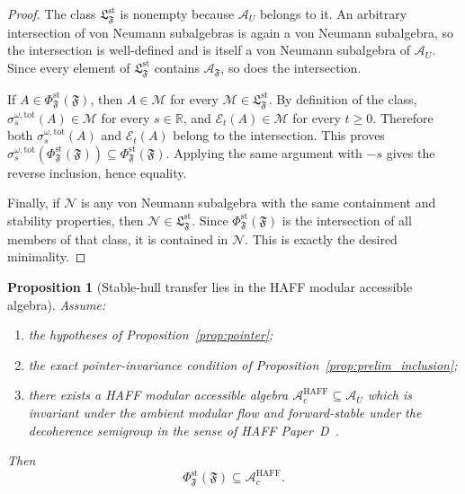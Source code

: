 \documentclass[12pt]{article}
\newtheorem{proposition}[theorem]{Proposition}
\theoremstyle{definition}
\theoremstyle{remark}
\begin{document}
\begin{proof}
The class \(\mathfrak L_{\mathfrak F}^{\mathrm{st}}\) is nonempty
because \(\mathcal A_U\) belongs to it. An arbitrary intersection of
von Neumann subalgebras is again a von Neumann subalgebra, so the
intersection is well-defined and is itself a von Neumann subalgebra of
\(\mathcal A_U\). Since every element of
\(\mathfrak L_{\mathfrak F}^{\mathrm{st}}\) contains
\(\mathcal A_{\mathfrak F}\), so does the intersection.

If \(A\in\Phi_{\mathfrak F}^{\mathrm{st}}(\mathfrak F)\), then
\(A\in\mathcal M\) for every
\(\mathcal M\in\mathfrak L_{\mathfrak F}^{\mathrm{st}}\). By definition
of the class,
\(\sigma_s^{\omega,\mathrm{tot}}(A)\in\mathcal M\) for every
\(s\in\mathbb R\), and
\(\mathcal E_t(A)\in\mathcal M\) for every \(t\ge 0\). Therefore both
\(\sigma_s^{\omega,\mathrm{tot}}(A)\) and \(\mathcal E_t(A)\) belong to
the intersection. This proves
\(\sigma_s^{\omega,\mathrm{tot}}(\Phi_{\mathfrak F}^{\mathrm{st}}(\mathfrak F))
\subseteq \Phi_{\mathfrak F}^{\mathrm{st}}(\mathfrak F)\). Applying the
same argument with \(-s\) gives the reverse inclusion, hence equality.

Finally, if \(\mathcal N\) is any von Neumann subalgebra with the same
containment and stability properties, then
\(\mathcal N\in\mathfrak L_{\mathfrak F}^{\mathrm{st}}\). Since
\(\Phi_{\mathfrak F}^{\mathrm{st}}(\mathfrak F)\) is the intersection of
all members of that class, it is contained in \(\mathcal N\). This is
exactly the desired minimality.
\end{proof}

\begin{proposition}[Stable-hull transfer lies in the HAFF modular accessible algebra]\label{prop:stablehull_inclusion}
Assume:
\begin{enumerate}
\item the hypotheses of Proposition~\ref{prop:pointer};
\item the exact pointer-invariance condition of
  Proposition~\ref{prop:prelim_inclusion};
\item there exists a HAFF modular accessible algebra
  \(\mathcal A_c^{\mathrm{HAFF}}\subseteq \mathcal A_U\) which is
  invariant under the ambient modular flow and forward-stable under the
  decoherence semigroup in the sense of HAFF Paper~D~\cite{HAFFD}.
\end{enumerate}
Then
\[
\Phi_{\mathfrak F}^{\mathrm{st}}(\mathfrak F)\subseteq
\mathcal A_c^{\mathrm{HAFF}}.
\]
\end{proposition}
\end{document}
